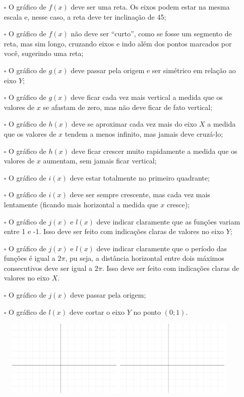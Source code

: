 \documentclass[main_estudante.tex]{subfiles}
\begin{document}
\begin{itemize}
 \item[$\square$] O gráfico de $f(x)$ deve ser uma reta. Os eixos podem estar na mesma escala e, nesse caso, a reta deve ter inclinação de 45\degree;
 \item[$\square$] O gráfico de $f(x)$ não deve ser ``curto'', como se fosse um segmento de reta, mas sim longo, cruzando eixos e indo além dos pontos marcados por você, sugerindo uma reta;
 \item[$\square$] O gráfico de $g(x)$ deve passar pela origem e ser simétrico em relação ao eixo $Y$;
 \item[$\square$] O gráfico de $g(x)$ deve ficar cada vez mais vertical a medida que os valores de $x$ se afastam de zero, mas não deve ficar de fato vertical;
 \item[$\square$] O gráfico de $h(x)$ deve se aproximar cada vez mais do eixo $X$ a medida que os valores de $x$ tendem a menos infinito, mas jamais deve cruzá-lo;
 \item[$\square$] O gráfico de $h(x)$ deve ficar crescer muito rapidamente a medida que os valores de $x$ aumentam, sem jamais ficar vertical;
 \item[$\square$] O gráfico de $i(x)$ deve estar totalmente no primeiro quadrante;
 \item[$\square$] O gráfico de $i(x)$ deve ser sempre crescente, mas cada vez mais lentamente (ficando mais horizontal a medida que $x$ cresce);
 \item[$\square$] O gráfico de $j(x)$ e $l(x)$ deve indicar claramente que as funções variam entre 1 e -1. Isso deve ser feito com indicações claras de valores no eixo $Y$;
 \item[$\square$] O gráfico de $j(x)$ e $l(x)$ deve indicar claramente que o período das funções é igual a $2\pi$, pu seja, a distância horizontal entre dois máximos consecutivos deve ser igual a $2\pi$. Isso deve ser feito com indicações claras de valores no eixo $X$.
 \item[$\square$] O gráfico de $j(x)$ deve passar pela origem;
 \item[$\square$] O gráfico de $l(x)$ deve cortar o eixo $Y$ no ponto $(0;1)$.
\end{itemize}

\newpage

\begin{figure}[h]
\centering
\includegraphics[width=\textwidth]{./img/c7q1.png}
\end{figure}
\end{document}
